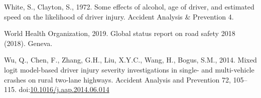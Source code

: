 \documentclass[]{elsarticle} %
\begin{document}
\leavevmode\hypertarget{ref-White1972effects}{}%
White, S., Clayton, S., 1972. Some effects of alcohol, age of driver,
and estimated speed on the likelihood of driver injury. Accident
Analysis \& Prevention 4.

\leavevmode\hypertarget{ref-WHO2019global}{}%
World Health Organization, 2019. Global status report on road safety
2018 (2018). Geneva.

\leavevmode\hypertarget{ref-Wu2014mixed}{}%
Wu, Q., Chen, F., Zhang, G.H., Liu, X.Y.C., Wang, H., Bogus, S.M., 2014.
Mixed logit model-based driver injury severity investigations in single-
and multi-vehicle crashes on rural two-lane highways. Accident Analysis
and Prevention 72, 105--115.
doi:\href{https://doi.org/10.1016/j.aap.2014.06.014}{10.1016/j.aap.2014.06.014}
\end{document}
